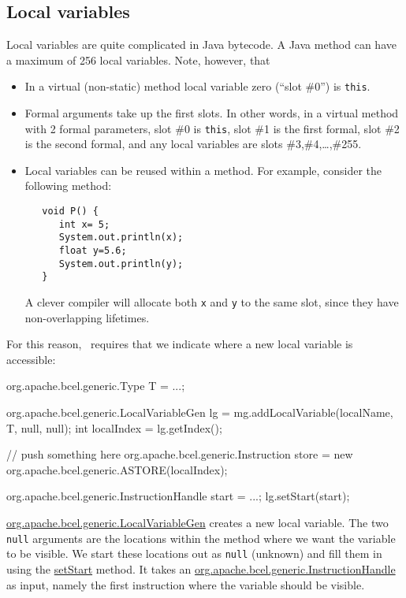 \subsection{Local variables}
Local variables are quite complicated in Java bytecode.
A Java method can have a maximum of 256 local variables.
Note, however, that
\begin{itemize}
   \item In a virtual (non-static) method local variable
         zero (``slot \#0'') is {\tt this}.
   \item Formal arguments take up the first slots.
         In other words, in a virtual method with
         2 formal parameters, slot \#0 is {\tt this},
         slot \#1 is the first formal, 
         slot \#2 is the second formal, and
         any local variables are slots \#3,\#4,\ldots,\#255.
   \item Local variables can be reused within a method.
         For example, consider the following method:
\begin{verbatim}
   void P() {
      int x= 5;
      System.out.println(x);
      float y=5.6;
      System.out.println(y);
   }
\end{verbatim}
   A clever compiler will allocate both {\tt x} and {\tt y}
   to the same slot, since they have non-overlapping lifetimes.
\end{itemize}

For this reason, \BCEL\ requires that we indicate where
a new local variable is accessible:
\begin{listing}{1}
   org.apache.bcel.generic.Type T = ...;

   org.apache.bcel.generic.LocalVariableGen lg = 
      mg.addLocalVariable(localName, T, null, null);
   int localIndex = lg.getIndex();

   // push something here
   org.apache.bcel.generic.Instruction store = 
      new org.apache.bcel.generic.ASTORE(localIndex);

   org.apache.bcel.generic.InstructionHandle start = ...;
   lg.setStart(start);
\end{listing}
\url{org.apache.bcel.generic.LocalVariableGen} creates
a new local variable. The two {\tt null} arguments are
the locations within the method where we want the
variable to be visible. We start these locations 
out as {\tt null} (unknown) and fill them in using
the \url{setStart} method. It takes an
\url{org.apache.bcel.generic.InstructionHandle} as
input, namely the first instruction where the 
variable should be visible.


